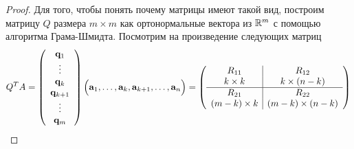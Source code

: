 \begin{proof}
  Для того, чтобы понять почему матрицы имеют такой вид,
  построим матрицу $Q$ размера $m\times m$ как ортонормальные вектора из $\mathbb{R}^m$
  с помощью алгоритма Грама-Шмидта. Посмотрим на произведение следующих матриц
  \[Q^TA=\left(\begin{array}{c}
        \mathbf{q}_1     \\
        \vdots           \\
        \mathbf{q}_k     \\
        \mathbf{q}_{k+1} \\
        \vdots           \\
        \mathbf{q}_m
      \end{array}\right)\Bigl(\mathbf{a}_1,\ldots,\mathbf{a}_k,\mathbf{a}_{k+1},\ldots,\mathbf{a}_n\Bigr)
    =\left(\begin{array}{c|c}
        R_{11}        & R_{12}              \\
        k \times k    & k \times (n - k)    \\
        \hline
        R_{21}        & R_{22}              \\
        (m-k)\times k & (m-k)\times (n - k)
      \end{array}\right)
  \]


\end{proof}
